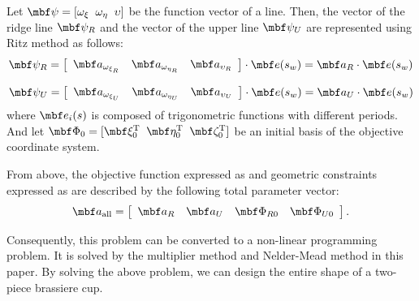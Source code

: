 \documentclass[E]{scitrans}
\begin{document}
Let $ \mbold{\psi} = [\omega_{\xi} \;\; \omega_{\eta} \;\; \upsilon] $ be the function vector of a line. Then, the vector of the ridge line $ \mbold{\psi}_R $ and the vector of the upper line $ \mbold{\psi}_U $ are represented using Ritz method\cite{c13} as follows:
\begin{equation}\label{eq:R_eq}
\mbold{\psi}_R = \left[ \begin{array}{ccc} \mbold{a}_{\omega_{\xi_R}}& \mbold{a}_{\omega_{\eta_R}}& \mbold{a}_{\upsilon_R} \end{array} \right] \cdot \mbold{e}(s_w) = \mbold{a}_R \cdot \mbold{e}(s_w) 
\end{equation}

\begin{equation}\label{eq:U_eq}
\mbold{\psi}_U = \left[ \begin{array}{ccc} \mbold{a}_{\omega_{\xi_U}}& \mbold{a}_{\omega_{\eta_U}}& \mbold{a}_{\upsilon_U} \end{array} \right] \cdot  \mbold{e}(s_w) = \mbold{a}_U \cdot \mbold{e}(s_w)
\end{equation}
where $ \mbold{e}_i(s) $ is composed of trigonometric functions with different periods. And let $ \mbold{\Phi}_0 = [\xivec_0^\mathrm{T} \;\; \etavec_0^\mathrm{T} \;\; \zetavec_0^\mathrm{T}] $ be an initial basis of the objective coordinate system.

From above, the objective function expressed as  and geometric constraints expressed as  are described by the following total parameter vector: 
\begin{equation}\label{eq:TotalCoefs}
\mbold{a}_{\mathrm{all}} = \left[ \begin{array}{cccc}
\mbold{a}_R & \mbold{a}_U & \mbold{\Phi}_{R0} &\mbold{\Phi}_{U0} 
\end{array}\right].
\end{equation}

Consequently, this problem can be converted to a non-linear programming problem. It is solved by the multiplier method and Nelder-Mead method in this paper. By solving the above problem, we can design the entire shape of a two-piece brassiere cup.
\end{document}
